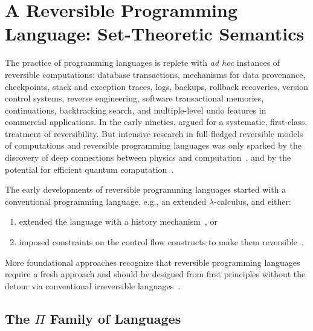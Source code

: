 \section{A Reversible Programming Language: Set-Theoretic Semantics}
\label{sec:reversibleone}
\label{sec:reversibletwo}
\label{langeqeq}

The practice of programming languages is replete with \emph{ad hoc} instances of reversible computations: database
transactions, mechanisms for data provenance, checkpoints, stack and exception traces, logs, backups, rollback
recoveries, version control systems, reverse engineering, software transactional memories, continuations, backtracking
search, and multiple-level undo features in commercial applications. In the early nineties,
\citet{Baker:1992:LLL,Baker:1992:NFT} argued for a systematic, first-class, treatment of reversibility. But intensive
research in full-fledged reversible models of computations and reversible programming languages was only sparked by the
discovery of deep connections between physics and
computation~\cite{Landauer:1961,PhysRevA.32.3266,Toffoli:1980,bennett1985fundamental,Frank:1999:REC:930275, Hey:1999:FCE:304763,fredkin1982conservative}, and by the
potential for efficient quantum computation~\cite{springerlink:10.1007/BF02650179}.

The early developments of reversible programming languages started
with a conventional programming language, e.g., an extended
$\lambda$-calculus, and either:
\begin{enumerate}
\item extended the language with a history
mechanism~\cite{vanTonder:2004,Kluge:1999:SEMCD,lorenz,danos2004reversible}, or
\item imposed constraints on the control flow constructs to make them
reversible~\cite{Yokoyama:2007:RPL:1244381.1244404}.
\end{enumerate}
More foundational approaches recognize that reversible programming languages require a fresh approach and should be
designed from first principles without the detour via conventional irreversible
languages~\cite{Yokoyama:2008:PRP,Mu:2004:ILRC,abramsky2005structural,DiPierro:2006:RCL:1166042.1166047,
  rc2011,James:2012:IE:2103656.2103667,Carette2016}.

\subsection{The $\Pi$ Family of Languages}

